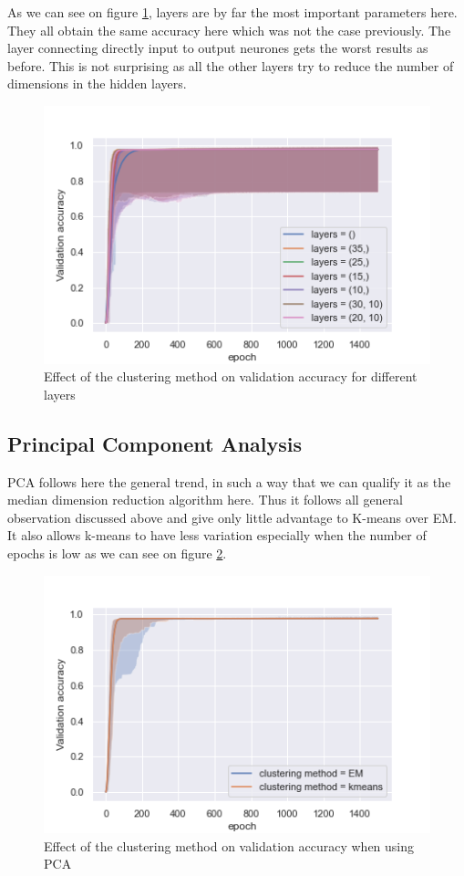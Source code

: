 \documentclass[twocolumn, 10pt]{article}
\begin{document}
			As we can see on figure \ref{fig:clusper_all_layers}, layers are by far the most important parameters here. They all obtain the same accuracy here which was not the case previously. The layer connecting directly input to output neurones gets the worst results as before. This is not surprising as all the other layers try to reduce the number of dimensions in the hidden layers.

			\begin{figure}[h]
				\centering
				\includegraphics[width=0.7\linewidth]{../graphics/clusper_all_epoch_val_categorical_accuracy_layers.png}
				\caption{Effect of the clustering method on validation accuracy for different layers}
				\label{fig:clusper_all_layers}
			\end{figure}
		\subsection{Principal Component Analysis}
			PCA follows here the general trend, in such a way that we can qualify it as the median dimension reduction algorithm here. Thus it follows all general observation discussed above and give only little advantage to K-means over EM. It also allows k-means to have less variation especially when the number of epochs is low as we can see on figure \ref{fig:clusper_pca_cm}.

			\begin{figure}[h]
				\centering
				\includegraphics[width=0.7\linewidth]{../graphics/clusper_PCA_epoch_val_categorical_accuracy_clustering_method.png}
				\caption{Effect of the clustering method on validation accuracy when using PCA}
				\label{fig:clusper_pca_cm}
			\end{figure}
\end{document}
